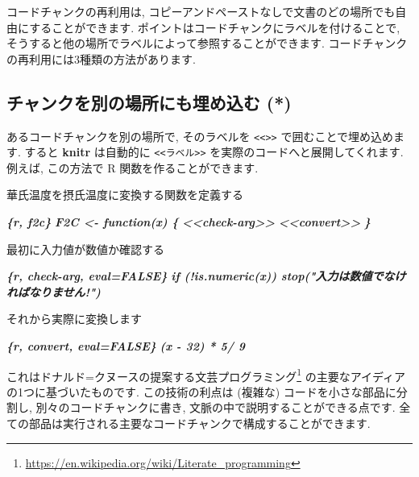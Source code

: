 \documentclass[
  11pt,
]{bxjsreport}
\newenvironment{Shaded}{\begin{snugshade}}{\end{snugshade}}
\newcommand{\InformationTok}[1]{\textcolor[rgb]{0.56,0.35,0.01}{\textbf{\textit{#1}}}}
\newcommand{\NormalTok}[1]{#1}
\renewcommand{\href}[2]{#2\footnote{\url{#1}}}
\begin{document}
コードチャンクの再利用は, コピーアンドペーストなしで文書のどの場所でも自由にすることができます. ポイントはコードチャンクにラベルを付けることで, そうすると他の場所でラベルによって参照することができます. コードチャンクの再利用には3種類の方法があります.

\hypertarget{embed-chunk}{%
\subsection{チャンクを別の場所にも埋め込む (*)}\label{embed-chunk}}

あるコードチャンクを別の場所で, そのラベルを \texttt{\textless{}\textless{}\textgreater{}\textgreater{}} で囲むことで埋め込めます. すると \textbf{knitr} は自動的に \texttt{\textless{}\textless{}ラベル\textgreater{}\textgreater{}} を実際のコードへと展開してくれます. 例えば, この方法で R 関数を作ることができます.

\begin{Shaded}
\begin{Highlighting}[]
\NormalTok{華氏温度を摂氏温度に変換する関数を定義する}

\InformationTok{\textasciigrave{}\textasciigrave{}\textasciigrave{}\{r, f2c\}}
\InformationTok{F2C \textless{}{-} function(x) \{}
\InformationTok{  \textless{}\textless{}check{-}arg\textgreater{}\textgreater{}}
\InformationTok{  \textless{}\textless{}convert\textgreater{}\textgreater{}}
\InformationTok{\}}
\InformationTok{\textasciigrave{}\textasciigrave{}\textasciigrave{}}

\NormalTok{最初に入力値が数値か確認する}

\InformationTok{\textasciigrave{}\textasciigrave{}\textasciigrave{}\{r, check{-}arg, eval=FALSE\}}
\InformationTok{  if (!is.numeric(x)) stop("入力は数値でなければなりません!")}
\InformationTok{\textasciigrave{}\textasciigrave{}\textasciigrave{}}

\NormalTok{それから実際に変換します}

\InformationTok{\textasciigrave{}\textasciigrave{}\textasciigrave{}\{r, convert, eval=FALSE\}}
\InformationTok{  (x {-} 32) * 5/ 9}
\InformationTok{\textasciigrave{}\textasciigrave{}\textasciigrave{}}
\end{Highlighting}
\end{Shaded}

これはドナルド=クヌースの提案する\href{https://en.wikipedia.org/wiki/Literate_programming}{文芸プログラミング} の主要なアイディアの1つに基づいたものです. この技術の利点は (複雑な) コードを小さな部品に分割し, 別々のコードチャンクに書き, 文脈の中で説明することができる点です. 全ての部品は実行される主要なコードチャンクで構成することができます.
\end{document}
